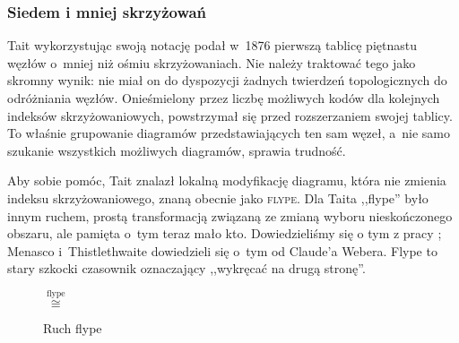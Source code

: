 
\subsubsection{Siedem i mniej skrzyżowań}
Tait wykorzystując swoją notację podał w~1876 pierwszą tablicę piętnastu węzłów o~mniej niż ośmiu skrzyżowaniach.
%
Nie należy traktować tego jako skromny wynik: nie miał on do dyspozycji żadnych twierdzeń topologicznych do odróżniania węzłów.
Onieśmielony przez liczbę możliwych kodów dla kolejnych indeksów skrzyżowaniowych, powstrzymał się przed rozszerzaniem swojej tablicy.
To właśnie grupowanie diagramów przedstawiających ten sam węzeł, a~nie samo szukanie wszystkich możliwych diagramów, sprawia trudność.

Aby sobie pomóc, Tait znalazł lokalną modyfikację diagramu, która nie zmienia indeksu skrzyżowaniowego, znaną obecnie jako \textsc{flype}.
%
%
Dla Taita ,,flype'' było innym ruchem, prostą transformacją związaną ze zmianą wyboru nieskończonego obszaru, ale pamięta o~tym teraz mało kto.
Dowiedzieliśmy się o tym z pracy \cite{menasco1993}; Menasco i~Thistlethwaite dowiedzieli się o~tym od Claude'a Webera.
%
%
%
Flype to stary szkocki czasownik oznaczający ,,wykręcać na drugą stronę''.

\begin{figure}[H]
    \centering
    \quad $\stackrel{\mathrm{flype}}{\cong}$ \quad
    \caption{Ruch flype}%
\end{figure}

